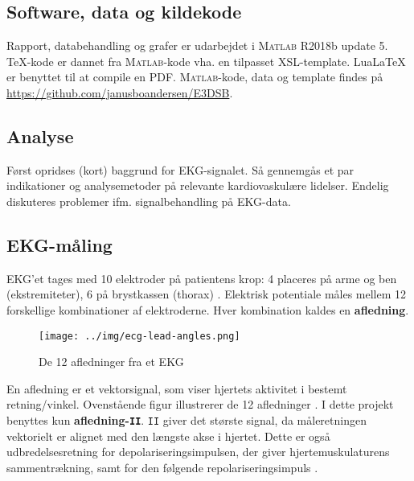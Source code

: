\documentclass[a4paper]{report}
\newcommand{\MATLAB}{\textsc{Matlab}}
\begin{document}
\begin{par}

\section{Software, data og kildekode}
Rapport, databehandling og grafer er udarbejdet i \MATLAB{} R2018b update 5.
\TeX-kode er dannet fra \MATLAB-kode vha. en tilpasset XSL-template.
Lua\LaTeX{} er benyttet til at compile en PDF.
\MATLAB-kode, data og template findes på \url{https://github.com/janusboandersen/E3DSB}.

\end{par} 
\begin{par}

\chapter{Analyse}
Først opridses (kort) baggrund for EKG-signalet.
Så gennemgås et par indikationer og analysemetoder på relevante kardiovaskulære lidelser.
Endelig diskuteres problemer ifm. signalbehandling på EKG-data.

\end{par} 



\section{EKG-måling}

        \begin{par}

EKG'et tages med 10 elektroder på patientens krop:
4 placeres på arme og ben (ekstremiteter), 6 på brystkassen (thorax) \cite{absalon}.
Elektrisk potentiale måles mellem 12 forskellige kombinationer af elektroderne.
Hver kombination kaldes en \textbf{afledning}.
\begin{figure}[H]
\centering
\texttt{[image: ../img/ecg-lead-angles.png]}
\caption{De 12 afledninger fra et EKG\label{fig:afledninger}}
\end{figure}
En afledning er et vektorsignal, som viser hjertets aktivitet i bestemt retning/vinkel.
Ovenstående figur illustrerer de 12 afledninger \cite{ecgbasics}.
I dette projekt benyttes kun \textbf{afledning-\texttt{II}}.
\texttt{II} giver det største signal, da måleretningen vektorielt er alignet med den længste akse i hjertet.
Dette er også udbredelsesretning for depolariseringsimpulsen, der giver hjertemuskulaturens sammentrækning,
samt for den følgende repolariseringsimpuls \cite[ca. 13m36s]{st2prj2}.

\end{par} 
\end{document}
